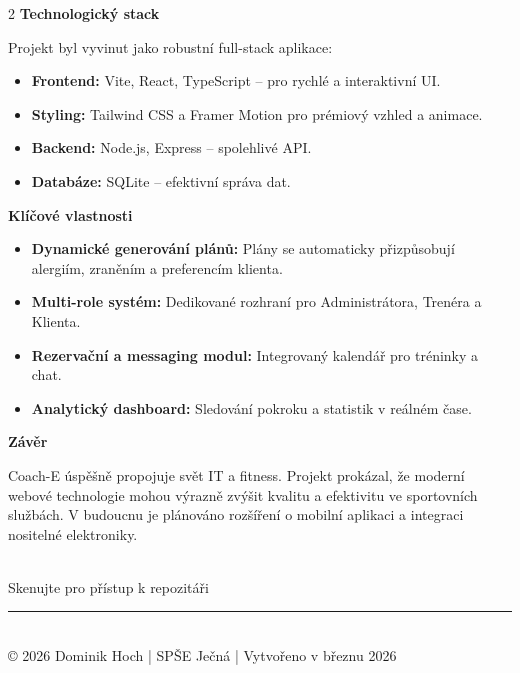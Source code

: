 \documentclass[final]{beamer}
\newcommand{\Heading}[1]{%
  \vspace{1.5em}%
  {\color{coachBlue}\bfseries\fontsize{48}{60}\selectfont #1}\par
  \vspace{0.8em}%
}
\begin{document}
\begin{frame}[t]
\begin{multicols}{2}
    \Heading{Technologický stack}
    Projekt byl vyvinut jako robustní full-stack aplikace:
    \begin{itemize}
        \item \textbf{Frontend:} Vite, React, TypeScript – pro rychlé a interaktivní UI.
        \item \textbf{Styling:} Tailwind CSS a Framer Motion pro prémiový vzhled a animace.
        \item \textbf{Backend:} Node.js, Express – spolehlivé API.
        \item \textbf{Databáze:} SQLite – efektivní správa dat.
    \end{itemize}

    \columnbreak

    \Heading{Klíčové vlastnosti}
    \begin{itemize}
        \item \textbf{Dynamické generování plánů:} Plány se automaticky přizpůsobují alergiím, zraněním a preferencím klienta.
        \item \textbf{Multi-role systém:} Dedikované rozhraní pro Administrátora, Trenéra a Klienta.
        \item \textbf{Rezervační a messaging modul:} Integrovaný kalendář pro tréninky a chat.
        \item \textbf{Analytický dashboard:} Sledování pokroku a statistik v reálném čase.
    \end{itemize}

    \Heading{Závěr}
    Coach-E úspěšně propojuje svět IT a fitness. Projekt prokázal, že moderní webové technologie mohou výrazně zvýšit kvalitu a efektivitu ve sportovních službách. V budoucnu je plánováno rozšíření o mobilní aplikaci a integraci nositelné elektroniky.

    \vspace{4cm}
    \begin{center}
       \\
      \vspace{0.5cm}
      {\small Skenujte pro přístup k repozitáři}
    \end{center}

  \end{multicols}

  \vfill
  \begin{center}
    \noindent\rule{0.5\linewidth}{1pt} \\
    \vspace{0.5cm}
    {\small © 2026 Dominik Hoch | SPŠE Ječná | Vytvořeno v březnu 2026}
  \end{center}

\end{frame}
\end{document}
